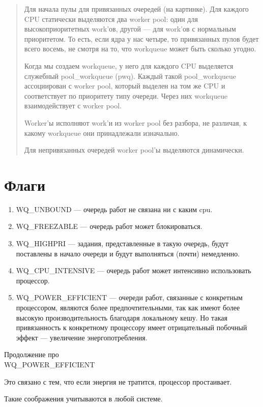\begin{quote}
	Для начала пулы для привязанных очередей (на картинке). Для каждого CPU статически выделяются два worker pool: один для высокоприоритетных work’ов, другой — для work’ов с нормальным приоритетом. То есть, если ядра у нас четыре, то привязанных пулов будет всего восемь, не смотря на то, что workqueue может быть сколько угодно.

Когда мы создаем workqueue, у него для каждого CPU выделяется служебный pool\_workqueue (pwq). Каждый такой pool\_workqueue ассоциирован с worker pool, который выделен на том же CPU и соответствует по приоритету типу очереди. Через них workqueue взаимодействует с worker pool.

Worker’ы исполняют work’и из worker pool без разбора, не различая, к какому workqueue они принадлежали изначально.

Для непривязанных очередей worker pool’ы выделяются динамически.
\end{quote}

\section{Флаги}

\begin{enumerate}
	\item WQ\_UNBOUND --- очередь работ не связана ни с каким cpu.
	\item WQ\_FREEZABLE --- очередь работ может блокироваться.
	\item WQ\_HIGHPRI --- задания, представленные в такую очередь, будут поставлены в начало очереди и будут выполняться (почти) немедленно.
	\item WQ\_CPU\_INTENSIVE --- очередь работ может интенсивно использовать процессор.
	\item WQ\_POWER\_EFFICIENT --- очереди работ, связанные с конкретным процессором, являются более предпочтительными, так как имеют более высокую производительность благодаря локальному кешу. Но такая привязанность к конкретному процессору имеет отрицательный побочный эффект --- увеличение энергопотребления.
\end{enumerate}

Продолжение про \\ WQ\_POWER\_EFFICIENT

Это связано с тем, что если энергия не тратится, процессор простаивает.

Такие соображения учитываются в любой системе.

